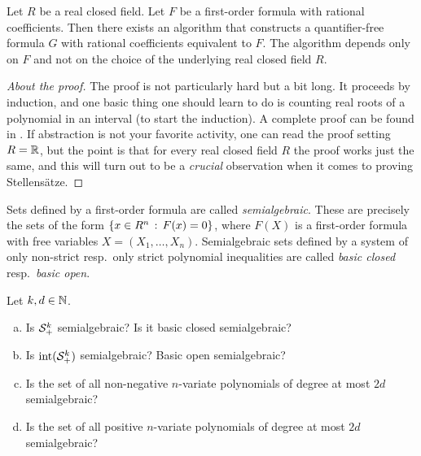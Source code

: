 \begin{theorem} 
	\label{thm:tarski-seidenberg}
	Let $R$ be a real closed field. Let $F$ be a first-order formula with rational coefficients. Then there exists an algorithm that constructs a quantifier-free formula $G$ with rational coefficients equivalent to $F$. The algorithm depends only on $F$ and not on the choice of the underlying real closed field $R$. 
\end{theorem}
\begin{proof}[About the proof]
	The proof is not particularly hard but a bit long. It proceeds by induction, and one basic thing one should learn to do is counting real roots of a polynomial in an interval (to start the induction). A complete proof can be found in \cite[Thm.~1.4.6]{Bochnak:Coste:Roy:1998}. If abstraction is not your favorite activity, one can read the proof setting $R=\mathbb{R}$, but the point is that for every real closed field $R$ the proof works just the same, and this will turn out to be a \emph{crucial} observation when it comes to proving Stellensätze. 
\end{proof}

Sets defined by a first-order formula are called \emph{semialgebraic}.
These are precisely the sets of the form $\left\{ x \in R^n \,:\, F(x)=0 \right\}$, where $F(X)$ is a first-order formula with free variables $X=(X_1,\ldots,X_n)$. Semialgebraic sets defined by a system of only non-strict resp.\ only strict polynomial inequalities are called \emph{basic closed} resp.\ \emph{basic open}.

\begin{exercise}
	Let $k,d \in \mathbb{N}$. 
	\begin{enumerate}[(a)]
		\item Is $\mathcal{S}_+^k$ semialgebraic? Is it basic closed semialgebraic?
		\item Is $\operatorname{int}(\mathcal{S}_+^k)$ semialgebraic? Basic open semialgebraic?
		\item Is the set of all non-negative $n$-variate polynomials of degree at most $2d$ semialgebraic?
		\item Is the set of all positive $n$-variate polynomials of degree at most $2d$ semialgebraic?
	\end{enumerate}
\end{exercise}

